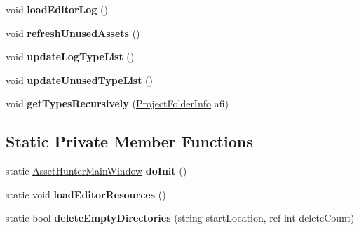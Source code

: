 \begin{DoxyCompactItemize}
\item 
\mbox{\label{class_asset_hunter_main_window_afaf6e92f5dac18e4640db6c855ba8940}} 
void {\bfseries load\+Editor\+Log} ()
\item 
\mbox{\label{class_asset_hunter_main_window_a429757b505b659c6a651287acad697e7}} 
void {\bfseries refresh\+Unused\+Assets} ()
\item 
\mbox{\label{class_asset_hunter_main_window_a3f83837edc03df2bec9403c9bf247403}} 
void {\bfseries update\+Log\+Type\+List} ()
\item 
\mbox{\label{class_asset_hunter_main_window_a03f0c442bd9ad8efc130213e4f7896b0}} 
void {\bfseries update\+Unused\+Type\+List} ()
\item 
\mbox{\label{class_asset_hunter_main_window_a6309b70079d524b308fbea105fd343ea}} 
void {\bfseries get\+Types\+Recursively} (\hyperlink{class_heureka_games_1_1_project_folder_info}{Project\+Folder\+Info} afi)
\end{DoxyCompactItemize}
\subsection*{Static Private Member Functions}
\begin{DoxyCompactItemize}
\item 
\mbox{\label{class_asset_hunter_main_window_a85a70fcb2a4f43f875557e2603b4ecbf}} 
static \hyperlink{class_asset_hunter_main_window}{Asset\+Hunter\+Main\+Window} {\bfseries do\+Init} ()
\item 
\mbox{\label{class_asset_hunter_main_window_a83766f2509b9c34b602d292f1c266c24}} 
static void {\bfseries load\+Editor\+Resources} ()
\item 
\mbox{\label{class_asset_hunter_main_window_a64ee95bd97ace39d7cde81feb0374ae3}} 
static bool {\bfseries delete\+Empty\+Directories} (string start\+Location, ref int delete\+Count)
\end{DoxyCompactItemize}
